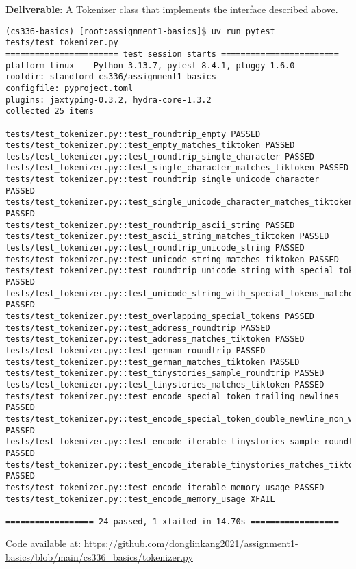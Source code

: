 \textbf{Deliverable}: A Tokenizer class that implements the interface described above.

\begin{lstlisting}
(cs336-basics) [root:assignment1-basics]$ uv run pytest tests/test_tokenizer.py
======================= test session starts ========================
platform linux -- Python 3.13.7, pytest-8.4.1, pluggy-1.6.0
rootdir: standford-cs336/assignment1-basics
configfile: pyproject.toml
plugins: jaxtyping-0.3.2, hydra-core-1.3.2
collected 25 items                                                 

tests/test_tokenizer.py::test_roundtrip_empty PASSED
tests/test_tokenizer.py::test_empty_matches_tiktoken PASSED
tests/test_tokenizer.py::test_roundtrip_single_character PASSED
tests/test_tokenizer.py::test_single_character_matches_tiktoken PASSED
tests/test_tokenizer.py::test_roundtrip_single_unicode_character PASSED
tests/test_tokenizer.py::test_single_unicode_character_matches_tiktoken PASSED
tests/test_tokenizer.py::test_roundtrip_ascii_string PASSED
tests/test_tokenizer.py::test_ascii_string_matches_tiktoken PASSED
tests/test_tokenizer.py::test_roundtrip_unicode_string PASSED
tests/test_tokenizer.py::test_unicode_string_matches_tiktoken PASSED
tests/test_tokenizer.py::test_roundtrip_unicode_string_with_special_tokens PASSED
tests/test_tokenizer.py::test_unicode_string_with_special_tokens_matches_tiktoken PASSED
tests/test_tokenizer.py::test_overlapping_special_tokens PASSED
tests/test_tokenizer.py::test_address_roundtrip PASSED
tests/test_tokenizer.py::test_address_matches_tiktoken PASSED
tests/test_tokenizer.py::test_german_roundtrip PASSED
tests/test_tokenizer.py::test_german_matches_tiktoken PASSED
tests/test_tokenizer.py::test_tinystories_sample_roundtrip PASSED
tests/test_tokenizer.py::test_tinystories_matches_tiktoken PASSED
tests/test_tokenizer.py::test_encode_special_token_trailing_newlines PASSED
tests/test_tokenizer.py::test_encode_special_token_double_newline_non_whitespace PASSED
tests/test_tokenizer.py::test_encode_iterable_tinystories_sample_roundtrip PASSED
tests/test_tokenizer.py::test_encode_iterable_tinystories_matches_tiktoken PASSED
tests/test_tokenizer.py::test_encode_iterable_memory_usage PASSED
tests/test_tokenizer.py::test_encode_memory_usage XFAIL

================== 24 passed, 1 xfailed in 14.70s ==================
\end{lstlisting}

\begin{answer}
Code available at: \url{https://github.com/donglinkang2021/assignment1-basics/blob/main/cs336_basics/tokenizer.py}
\end{answer}

